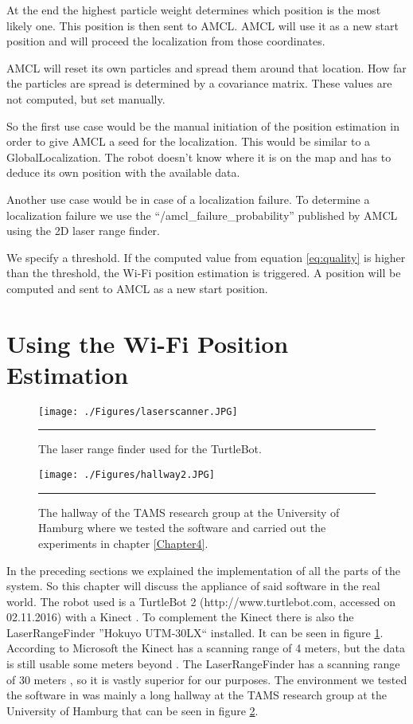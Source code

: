 At the end the highest particle weight determines which position is the most likely one. This position is then sent to AMCL. AMCL will use it as a new start position and will proceed the localization from those coordinates. 

AMCL will reset its own particles and spread them around that location. How far the particles are spread is determined by a covariance matrix. These values are not computed, but set manually.

So the first use case would be the manual initiation of the position estimation in order to give AMCL a seed for the localization. This would be similar to a \gls{GlobalLocalization}. The robot doesn't know where it is on the map and has to deduce its own position with the available data. 

Another use case would be in case of a localization failure. To determine a localization failure we use the ``/amcl\_failure\_probability'' published by AMCL using the 2D laser range finder.

We specify a threshold. If the computed value from equation \ref{eq:quality} is higher than the threshold, the Wi-Fi position estimation is triggered. A position will be computed and sent to AMCL as a new start position. 

\section{Using the Wi-Fi Position Estimation}
\begin{figure}[htbp]
	\centering
		\texttt{[image: ./Figures/laserscanner.JPG]}
		\rule{35em}{0.5pt}
	\caption[Laser Range Finder]{The laser range finder used for the TurtleBot.}
	\label{fig:laserrangefinder}
\end{figure}
\begin{figure}[htbp]
	\centering
		\texttt{[image: ./Figures/hallway2.JPG]}
		\rule{35em}{0.5pt}
	\caption[Hallway]{The hallway of the TAMS research group at the University of Hamburg where we tested the software and carried out the experiments in chapter \ref{Chapter4}.}
	\label{fig:hallway}
\end{figure}
In the preceding sections we explained the implementation of all the parts of the system. So this chapter will discuss the appliance of said software in the real world. The robot used is a TurtleBot 2 (http://www.turtlebot.com, accessed on 02.11.2016) with a Kinect \citep{ece21221}. To complement the Kinect there is also the \gls{LaserRangeFinder} ''Hokuyo UTM-30LX`` \citep{laser} installed. It can be seen in figure \ref{fig:laserrangefinder}. According to Microsoft the Kinect has a scanning range of 4 meters, but the data is still usable some meters beyond \citep{ece21221}. The \gls{LaserRangeFinder} has a scanning range of 30 meters \citep{laser}, so it is vastly superior for our purposes.  The environment we tested the software in was mainly a long hallway at the TAMS research group at the University of Hamburg that can be seen in figure \ref{fig:hallway}. 

